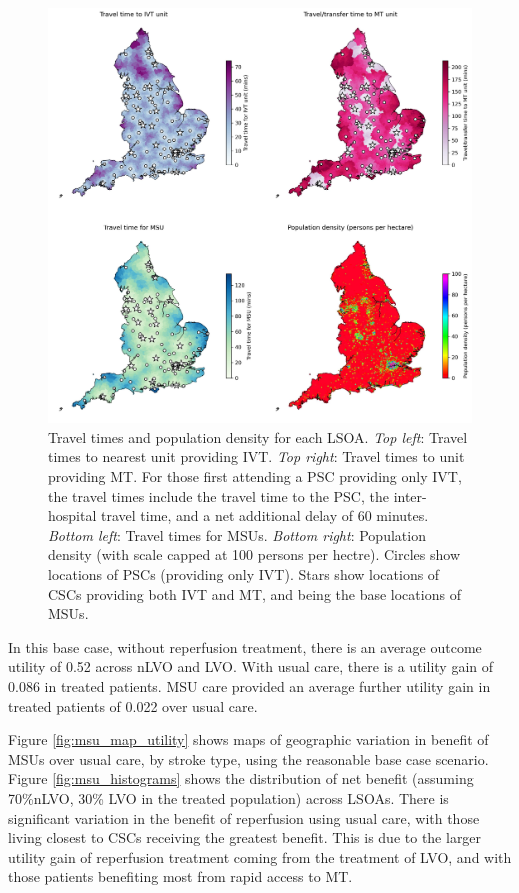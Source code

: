 \begin{figure}[h!]
    \centering
    \includegraphics[width=1.0\linewidth]{images/map_times.jpg}
    \caption{Travel times and population density for each LSOA. \textit{Top left}: Travel times to nearest unit providing IVT. \textit{Top right}: Travel times to unit providing MT. For those first attending a PSC providing only IVT, the travel times include the travel time to the PSC, the inter-hospital travel time, and a net additional delay of 60 minutes. \textit{Bottom left}: Travel times for MSUs. \textit{Bottom right}: Population density (with scale capped at 100 persons per hectre). Circles show locations of PSCs (providing only IVT). Stars show locations of CSCs providing both IVT and MT, and being the base locations of MSUs.}
    \label{fig:map_times}
\end{figure}


In this base case, without reperfusion treatment, there is an average outcome utility of 0.52 across nLVO and LVO. With usual care, there is a utility gain of 0.086 in treated patients. MSU care provided an average further utility gain in treated patients of 0.022 over usual care.

Figure \ref{fig:msu_map_utility} shows maps of geographic variation in benefit of MSUs over usual care, by stroke type, using the reasonable base case scenario. Figure \ref{fig:msu_histograms} shows the distribution of net benefit (assuming 70\%nLVO, 30\% LVO in the treated population) across LSOAs. There is significant variation in the benefit of reperfusion using usual care, with those living closest to CSCs receiving the greatest benefit. This is due to the larger utility gain of reperfusion treatment coming from the treatment of LVO, and with those patients benefiting most from rapid access to MT.

